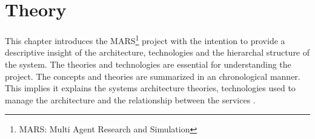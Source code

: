 \newpage
\chapter{Theory}
	
This chapter introduces the MARS\footnote{MARS: Multi Agent Research and Simulation} project with the intention to provide a descriptive insight
of the architecture, technologies and the hierarchal structure of the system. The theories and
technologies are essential for understanding the project. The concepts and theories are summarized
in an chronological manner. This implies it explains the systems architecture theories,
technologies used to manage the architecture and the relationship between the services \cite{SOA}.
	
	
	
